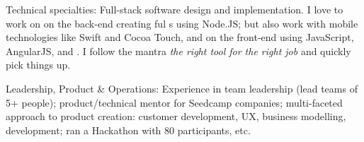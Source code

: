 \documentclass[10pt,a4paper]{article}
\begin{document}
\inlineheadsection  %
  {Technical specialties:}
  {Full-stack software design and implementation. I love to work on on the back-end creating ful s using Node.JS; but also work with mobile technologies like Swift and Cocoa Touch, and on the front-end using JavaScript, AngularJS,  and . I follow the mantra \emph{the right tool for the right job} and quickly pick things up.}

\inlineheadsection  %
  {Leadership, Product \& Operations:}
  {Experience in team leadership (lead teams of 5+ people); product/technical mentor for Seedcamp companies; multi-faceted approach to product creation: customer development, UX, business modelling, development; ran a Hackathon with 80 participants, etc.}

\spacedhrule{1.5em}{-0.4em}

\end{document}
